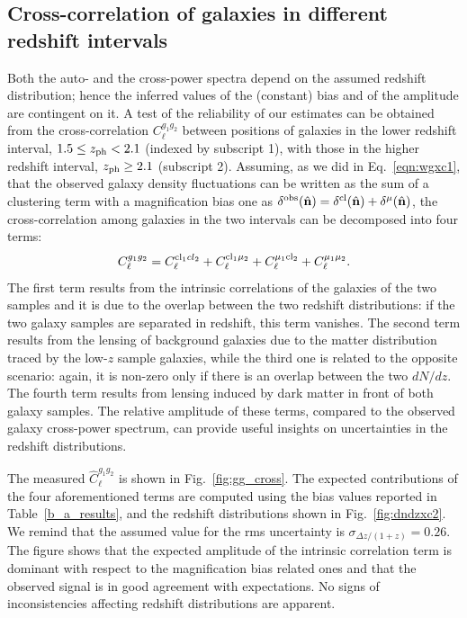 \subsection{Cross-correlation of galaxies in different redshift intervals}
Both the auto- and the cross-power spectra depend on the assumed redshift distribution; hence the inferred values of the (constant) bias and of the amplitude are contingent on it. A test of the reliability of our estimates can be obtained from the cross-correlation $C_{\ell}^{g_1g_2}$ between positions of galaxies in the lower redshift interval, $1.5 \le z_{\rm{ph}} < 2.1$ (indexed by subscript 1), with those in the higher redshift interval, $z_{\rm{ph}}\ge 2.1$ (subscript 2). Assuming, as we did in Eq.~\eqref{eqn:wgxc1}, that the observed galaxy density fluctuations can be written as the sum of a clustering term with a magnification bias one as $\delta^{\rm{obs}}(\nver) = \delta^{\rm{cl}}(\nver) + \delta^{\mu}(\nver)$,  the cross-correlation among galaxies in the two intervals can be decomposed into four terms:
%
\begin{equation}
\label{eq:gg_cross}
C_{\ell}^{g_1g_2} = C_{\ell}^{\rm{cl}_1 cl_2} + C_{\ell}^{\rm{cl}_1 \mu_2} + C_{\ell}^{\mu_1 \rm{cl}_2} + C_{\ell}^{\mu_1 \mu_2}.
\end{equation}
%
The first term results from the intrinsic correlations of the galaxies of the two samples and it is due to the overlap between the two redshift
distributions: if the two galaxy samples are separated in redshift, this term vanishes. The second term results from the lensing of
background galaxies due to the matter distribution traced by the low-$z$ sample galaxies, while the third one is related to the
opposite scenario: again, it is non-zero only if there is an overlap between the two $dN/dz$. The fourth term results from lensing induced
by dark matter in front of both galaxy samples. The relative amplitude of these terms, compared to the observed galaxy cross-power spectrum,
can provide useful insights on uncertainties in the redshift distributions.

The measured $\hat{C}^{g_1g_2}_{\ell}$ is shown in Fig.~\eqref{fig:gg_cross}. The expected contributions of the four aforementioned terms are
computed using the bias values reported in Table~\eqref{b_a_results}, and the redshift distributions shown in Fig.~\eqref{fig:dndzxc2}. We remind that the assumed value for the rms uncertainty is $\sigma_{\Delta z/(1+z)}=0.26$. The figure shows that the expected amplitude of the intrinsic correlation term is dominant with respect to the magnification bias related ones and that the observed signal is in good agreement with expectations. No signs of inconsistencies affecting redshift distributions are apparent.

